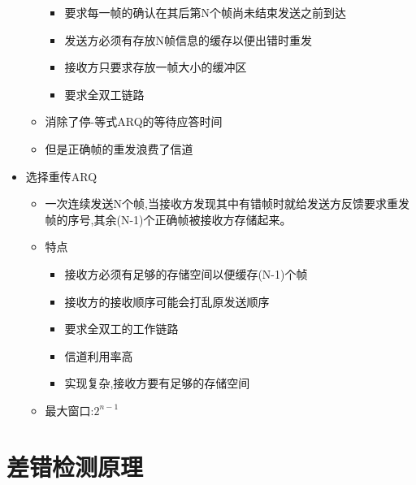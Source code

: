 \documentclass[a4paper,12pt,notitlepage]{article}
\begin{document}
\begin{itemize}
\begin{itemize}
		\begin{itemize}
			\item 要求每一帧的确认在其后第N个帧尚未结束发送之前到达
			\item 发送方必须有存放N帧信息的缓存以便出错时重发
			\item 接收方只要求存放一帧大小的缓冲区
			\item 要求全双工链路
		\end{itemize}
		\item 消除了停-等式ARQ的等待应答时间
		\item 但是正确帧的重发浪费了信道
	\end{itemize}
	\item 选择重传ARQ
	\begin{itemize}
		\item 一次连续发送N个帧,当接收方发现其中有错帧时就给发送方反馈要求重发帧的序号,其余(N-1)个正确帧被接收方存储起来。
		\item 特点
		\begin{itemize}
			\item 接收方必须有足够的存储空间以便缓存(N-1)个帧
			\item 接收方的接收顺序可能会打乱原发送顺序
			\item 要求全双工的工作链路
			\item 信道利用率高
			\item 实现复杂,接收方要有足够的存储空间
		\end{itemize}	
		\item 最大窗口:$2^{n-1}$			
	\end{itemize}
\end{itemize} 

\section{差错检测原理}
\end{document}
